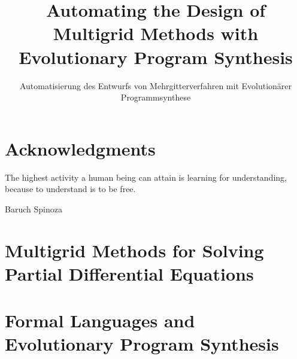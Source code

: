 \documentclass[
  paper = a5paper,
  language = english,
  acronym = nosymbol,
  acronymline = novertical,
  bibliography = combined,
  bibliographypart = all,
  titlesize = Huge,
  par = halfskip,
]{faupress}
\title{Automating the Design of Multigrid Methods with Evolutionary Program Synthesis}
\subtitle{Automatisierung des Entwurfs von Mehrgitterverfahren mit Evolutionärer Programmsynthese}
\institute{\phantom{}}
\theoremstyle{definition}
\numberwithin{equation}{chapter}
\begin{document}
\maketitle

\frontmatter
  
  \makefacultytitle
  \begin{abstract}
    
  \end{abstract}
  \begin{zusammenfassung}
    
  \end{zusammenfassung}
\chapter*{Acknowledgments}

\tableofcontents
\mainmatter

\begin{introduction}
\epigraph{The highest activity a human being can attain is learning for understanding, because to understand is to be free.}{Baruch Spinoza}

\end{introduction}
\chapter{Multigrid Methods for Solving Partial Differential Equations}
  
  
  
\chapter{Formal Languages and Evolutionary Program Synthesis}
\label{chapter:formal-languages-and-gp}
  
  
\end{document}
